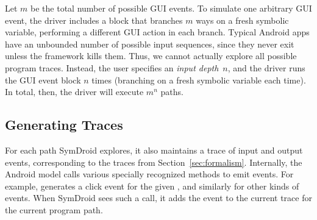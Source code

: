 \documentclass{entcs} \usepackage{entcsmacro}
\newcommand{\code}[1]{\text{\lstinline!#1!}}
\begin{document}

Let $m$ be the total number of possible GUI events.  To simulate one
arbitrary GUI event, the driver includes a block that branches $m$
ways on a fresh symbolic variable, performing a different GUI action
in each branch.  Typical Android apps have an unbounded number of
possible input sequences, since they never exit unless the framework
kills them. Thus, we cannot actually explore all possible program
traces. Instead, the user specifies an \emph{input depth}~$n$, and the
driver runs the GUI event block $n$ times (branching on a fresh
symbolic variable each time). In total, then, the driver will execute
$m^n$ paths.

\subsection{Generating Traces}
\label{sec:symbolic-traces}

For each path SymDroid explores, it also maintains a trace of input
and output events, corresponding to the traces from
Section~\ref{sec:formalism}. Internally, the Android model calls various
specially recognized methods to emit events. For example,
\code{Trace.addClick(id)} generates a click event for the given
\code{id}, and similarly for other kinds of events.
When SymDroid sees such a call, it adds the event to the current trace
for the current program path.

\end{document}
